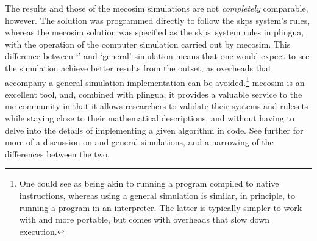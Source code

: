 The \fsharp{} results and those of the \gls{mecosim} simulations are not \emph{completely} comparable, however.  The \fsharp{} solution was programmed directly to follow the \gls{skps} system's rules, whereas the \gls{mecosim} solution was specified as the \gls{skps}~system rules in \gls{plingua}, with the operation of the computer simulation carried out by \gls{mecosim}.  This difference between `\adhoc{}' and `general' simulation means that one would expect to see the \fsharp{} simulation achieve better results from the outset, as overheads that accompany a general simulation implementation can be avoided.\footnote{One could see \adhoc{} as being akin to running a program compiled to native instructions, whereas using a general simulation is similar, in principle, to running a program in an interpreter.  The latter is typically simpler to work with and more portable, but comes with overheads that slow down execution.}  \Gls{mecosim} is an excellent tool, and, combined with \gls{plingua}, it provides a valuable service to the \gls{mc} community in that it allows researchers to validate their systems and \glspl{ruleset} while staying close to their mathematical descriptions, and without having to delve into the details of implementing a given algorithm in code.  See further \cite{Perez-Hurtado2019} for more of a discussion on \adhoc{} and general simulations, and a narrowing of the differences between the two.